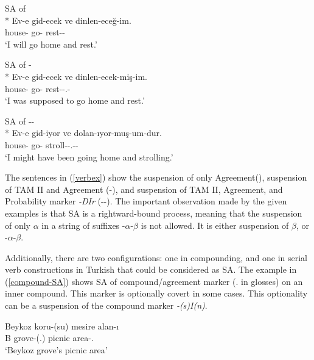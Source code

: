 \begin{exe}
    \ex \label{verbex}
    \begin{xlist}
        \ex SA of {\Fsg}\\*
        \gll Ev-e gid-ecek ve dinlen-eceğ-im. \\ 
        house-{\Dat} go-{\Fut} {\And} rest-{\Fut}-{\Fsg} \\
        \glt `I will go home and rest.'
        
        \ex SA of {\Evi-\Fsg}\\*
        \gll 
        Ev-e gid-ecek ve dinlen-ecek-miş-im. \\ 
        house-{\Dat} go-{\Fut} {\And} rest-{\Fut}-{\Cop}.{\Evi}-{\Fsg} \\
        \glt  `I was supposed to go home and rest.'
        
        \ex SA of {\Evi-\Fsg-\Prob}\\*
        \gll Ev-e gid-iyor ve dolan-ıyor-muş-um-dur. \\ 
        house-{\Dat} go-{\Fut} {\And} stroll-{\Prog}-{\Cop}.{\Evi}-{\Fsg}-{\Prob} \\
        \glt `I might have been going home and strolling.'
    \end{xlist}
\end{exe}

The sentences in (\ref{verbex}) show the suspension of only Agreement(\Fsg), suspension of TAM II and Agreement (\Evi-\Fsg), and suspension of TAM II, Agreement, and Probability marker \textit{-DIr} (\Evi-\Fsg-\Prob). The important observation made by the given examples is that SA is a rightward-bound process, meaning that the suspension of only $\alpha$ in a string of suffixes -$\alpha$-$\beta$ is not allowed. It is either suspension of $\beta$, or -$\alpha$-$\beta$.

Additionally, there are two configurations: one in compounding, and one in serial verb constructions in Turkish that could be considered as SA. The example in (\ref{compound-SA}) shows SA of compound/agreement marker ({\Poss}.{\Tsg} in glosses) on an inner compound. This marker is optionally covert in some cases. This optionality can be a suspension of the compound marker \textit{-(s)I(n)}.

\begin{exe}
    \ex \label{compound-SA}
    \gll Beykoz koru-(su) mesire alan-ı \\ 
    B grove-({\Poss}.{\Tsg}) picnic area-{\Poss}.{\Tsg} \\
    \glt `Beykoz grove's picnic area'
 \end{exe}
 
